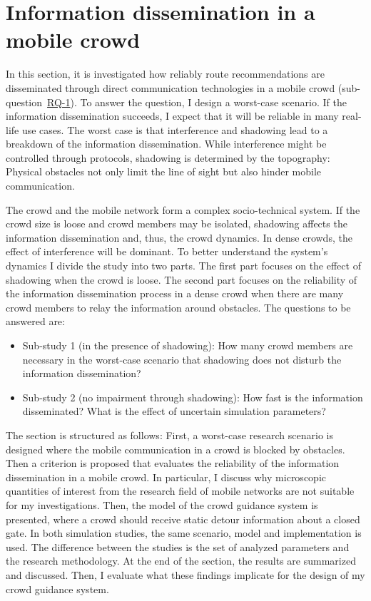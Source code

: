 \section{Information dissemination in a mobile crowd}
\label{sec:infoverbreitung}

In this section, it is investigated how reliably route recommendations are disseminated through direct communication technologies in a mobile crowd (sub-question~\hyperref[reserachquestions]{RQ-1}). To answer the question, I design a worst-case scenario. If the information dissemination succeeds, I expect that it will be reliable in many real-life use cases.
The worst case is that interference and shadowing lead to a breakdown of the information dissemination. While interference might be controlled through protocols, shadowing is determined by the topography: Physical obstacles not only limit the line of sight but also hinder mobile communication. 

The crowd and the mobile network form a complex socio-technical system. If the crowd size is loose and crowd members may be isolated, shadowing affects the information dissemination and, thus, the crowd dynamics. In dense crowds, the effect of interference will be dominant. To better understand the system's dynamics I divide the study into two parts. The first part focuses on the effect of shadowing when the crowd is loose. The second part focuses on the reliability of the information dissemination process in a dense crowd when there are many crowd members to relay the information around obstacles. The questions to be answered are:

\begin{itemize}
\item Sub-study 1 (in the presence of shadowing): How many crowd members are necessary in the worst-case scenario that shadowing does not disturb the information dissemination?
\item Sub-study 2 (no impairment through shadowing): How fast is the information disseminated? What is the effect of uncertain simulation parameters?
\end{itemize}

The section is structured as follows: First, a worst-case research scenario is designed where the mobile communication in a crowd is blocked by obstacles. Then a criterion is proposed that evaluates the reliability of the information dissemination in a mobile crowd. In particular, I discuss why microscopic quantities of interest from the research field of mobile networks are not suitable for my investigations. Then, the model of the crowd guidance system is presented, where a crowd should receive static detour information about a closed gate. 
In both simulation studies, the same scenario, model and implementation is used. The difference between the studies is the set of analyzed parameters and the research methodology. At the end of the section, the results are summarized and discussed. Then, I evaluate what these findings implicate for the design of my crowd guidance system.


